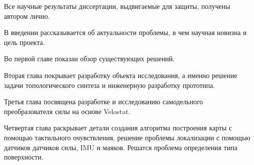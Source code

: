 {\contribution} Все научные результаты диссертации, выдвигаемые для защиты, получены автором лично.



{\struct}
В введении рассказывается об актуальности проблемы, в чем научная новизна и цель проекта.

Во первой главе показан обзор существующих решений.

Вторая глава покрывает разработку объекта исследования, а именно решение задачи топологического синтеза и инженерную разработку прототипа.

Третья глава посвящена разработке и исследованию самодельного преобразователя силы на основе Velostat.

Четвертая глава раскрывает детали создания алгоритма построения карты с помощью тактильного очувствления, решение проблемы локализации с помощью датчиков датчиков силы, IMU и маяков. Решатся проблема определения типа поверхности.